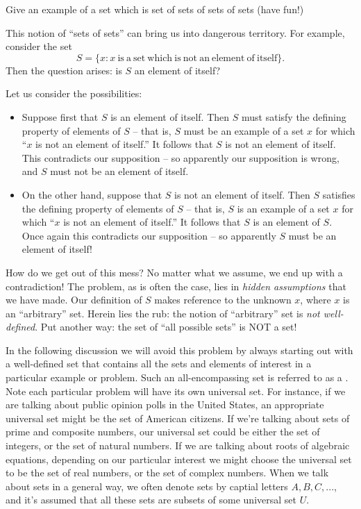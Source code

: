 \begin{exercise}{}
Give an example of a set which is set of sets of sets of sets (have fun!)
\end{exercise}

This notion of ``sets of sets'' can bring us into dangerous territory. For example, consider the set 
\[S = \{ x : x \mathrm{~is~a~set~which~is~not~an~element~of~itself} \}. \]
Then the question arises: is $S$ an element of itself? 

Let us consider the possibilities:
\begin{itemize}
\item
 Suppose first that $S$ is an element of itself. 
Then $S$ must satisfy the defining property of elements of  $S$ -- that is, $S$ must be an example of a set $x$ for which ``$x$ is  not an element of itself.'' It follows that $S$ is not an element of itself.  This contradicts our supposition -- so apparently our supposition is wrong, and $S$ must not be an element of itself.
\item
On the other hand, suppose that $S$ is not an element of itself. Then $S$ satisfies the defining property of elements of  $S$ -- that is, $S$ is an example of a set $x$ for which ``$x$ is  not an element of itself.'' It follows that $S$ is an element of $S$.  Once again this contradicts our supposition -- so apparently $S$ must be an element of itself!
\end{itemize}
How do we get out of this mess? No matter what we assume, we end up with a contradiction! The problem, as is often the case, lies in  \emph{hidden assumptions} that we have made. Our definition of $S$ makes reference to the unknown $x$, where $x$ is an ``arbitrary'' set. Herein lies the rub:  the notion of ``arbitrary'' set is \emph{not well-defined}. Put another way: the set of ``all possible sets'' is NOT a set!

In the following discussion we will avoid this problem by always starting out with a well-defined set that contains all the sets and elements of interest in a particular example or problem. Such an all-encompassing set is referred to as a . Note each particular problem will have its own universal set. For instance, if we are talking about public opinion polls  in the United States, an appropriate universal set might be the set of American citizens. If we're talking about sets of prime and composite numbers, our universal set could be either the set of integers, or the set of natural numbers. If we are talking about roots of algebraic equations, depending on our particular interest we might choose the universal set to be the set of real numbers, or the set of complex numbers. When we talk about sets in a general way, we often denote sets by captial  letters $A, B, C,...$, and it's assumed that all these sets are subsets of some universal set $U$.

